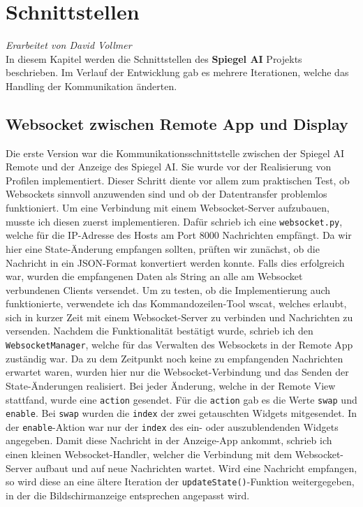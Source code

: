 \chapter{Schnittstellen}
\textit{Erarbeitet von David Vollmer} \\
In diesem Kapitel werden die Schnittstellen des \textbf{Spiegel AI} Projekts beschrieben. Im Verlauf der Entwicklung gab es mehrere Iterationen, welche das Handling der Kommunikation änderten.

\section{Websocket zwischen Remote App und Display}
Die erste Version war die Kommunikationsschnittstelle zwischen der Spiegel AI Remote und der Anzeige des Spiegel AI. Sie wurde vor der Realisierung von Profilen implementiert. Dieser Schritt diente vor allem zum praktischen Test, ob Websockets sinnvoll anzuwenden sind und ob der Datentransfer problemlos funktioniert. Um eine Verbindung mit einem Websocket-Server aufzubauen, musste ich diesen zuerst implementieren. Dafür schrieb ich eine \texttt{websocket.py}, welche für die IP-Adresse des Hosts am Port 8000 Nachrichten empfängt. Da wir hier eine State-Änderung empfangen sollten, prüften wir zunächst, ob die Nachricht in ein JSON-Format konvertiert werden konnte. Falls dies erfolgreich war, wurden die empfangenen Daten als String an alle am Websocket verbundenen Clients versendet. Um zu testen, ob die Implementierung auch funktionierte, verwendete ich das Kommandozeilen-Tool wscat, welches erlaubt, sich in kurzer Zeit mit einem Websocket-Server zu verbinden und Nachrichten zu versenden. Nachdem die Funktionalität bestätigt wurde, schrieb ich den \texttt{WebsocketManager}, welche für das Verwalten des Websockets in der Remote App zuständig war. Da zu dem Zeitpunkt noch keine zu empfangenden Nachrichten erwartet waren, wurden hier nur die Websocket-Verbindung und das Senden der State-Änderungen realisiert. Bei jeder Änderung, welche in der Remote View stattfand, wurde eine \texttt{action} gesendet. Für die \texttt{action} gab es die Werte \texttt{swap} und \texttt{enable}. Bei \texttt{swap} wurden die \texttt{index} der zwei getauschten Widgets mitgesendet. In der \texttt{enable}-Aktion war nur der \texttt{index} des ein- oder auszublendenden Widgets angegeben. Damit diese Nachricht in der Anzeige-App ankommt, schrieb ich einen kleinen Websocket-Handler, welcher die Verbindung mit dem Websocket-Server aufbaut und auf neue Nachrichten wartet. Wird eine Nachricht empfangen, so wird diese an eine ältere Iteration der \texttt{updateState()}-Funktion weitergegeben, in der die Bildschirmanzeige entsprechen angepasst wird. \\
